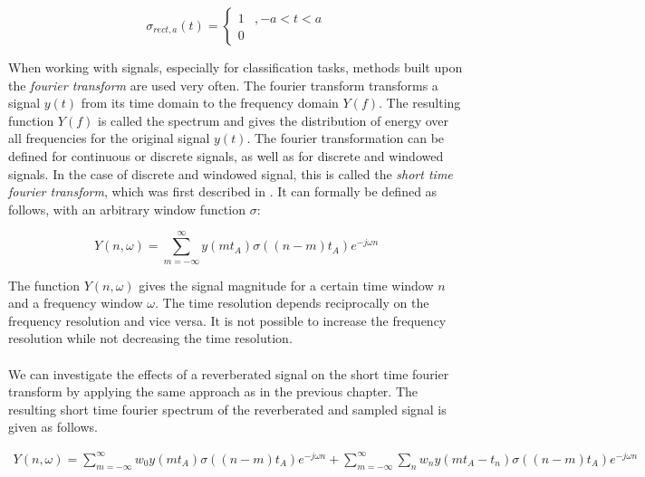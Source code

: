 \[
\sigma_{rect,a}(t) = \begin{cases}
1 &,-a < t < a \\
0
\end{cases}
\]

When working with signals, especially for classification tasks, methods built upon the \textit{fourier transform} are used very often. The fourier transform transforms a signal $y(t)$ from its time domain to the frequency domain $Y(f)$. The resulting function $Y(f)$ is called the spectrum and gives the distribution of energy over all frequencies for the original signal $y(t)$. The fourier transformation can be defined for continuous or discrete signals, as well as for discrete and windowed signals. In the case of discrete and windowed signal, this is called the \textit{short time fourier transform}, which was first described in \cite{gabor1946theory}. It can formally be defined as follows, with an arbitrary window function $\sigma$:

\[
Y(n, \omega) = \sum_{m = -\infty}^{\infty} y(mt_A) \sigma((n - m)t_A) e^{-j \omega n}  
\]

The function $Y(n, \omega)$ gives the signal magnitude for a certain time window $n$ and a frequency window $\omega$. The time resolution depends reciprocally on the frequency resolution and vice versa. It is not possible to increase the frequency resolution while not decreasing the time resolution.\\ \\

We can investigate the effects of a reverberated signal on the short time fourier transform by applying the same approach as in the previous chapter. The resulting short time fourier spectrum of the reverberated and sampled signal is given as follows.

\begin{align*}
Y(n, \omega) = \sum_{m = -\infty}^{\infty} w_0 y(mt_A) \sigma((n - m)t_A) e^{-j \omega n} + 
\sum_{m = -\infty}^{\infty} \sum_{n} w_n y(mt_A - t_n) \sigma((n - m)t_A) e^{-j \omega n}  
\label{eq:stftnoise}
\end{align*}

